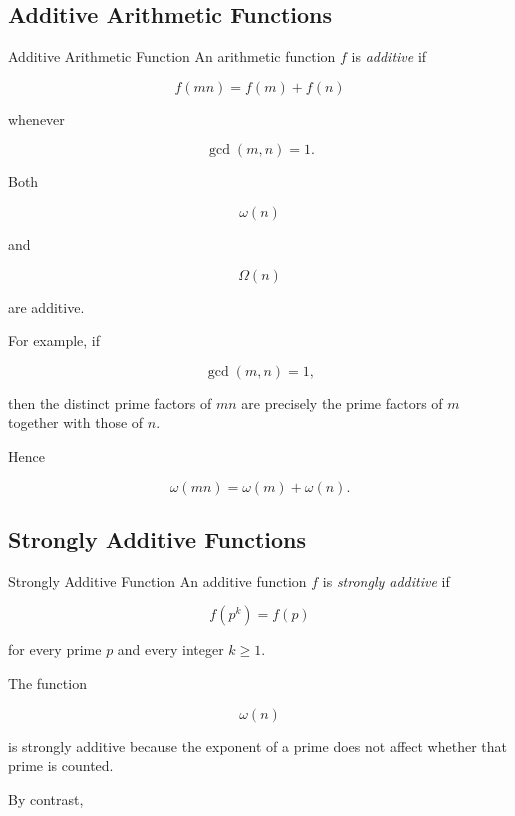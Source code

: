 \subsection{Additive Arithmetic Functions}
\label{subsec:additive-arithmetic-functions-probabilistic}

\begin{definitionbox}{Additive Arithmetic Function}
An arithmetic function \(f\) is \emph{additive} if

\[ f(mn)=f(m)+f(n) \]

whenever

\[ \gcd(m,n)=1. \]
\end{definitionbox}

Both

\[ \omega(n) \]

and

\[ \Omega(n) \]

are additive.

For example, if

\[ \gcd(m,n)=1, \]

then the distinct prime factors of \(mn\) are precisely the prime factors of
\(m\) together with those of \(n\).

Hence

\[ \omega(mn)=\omega(m)+\omega(n). \]

\subsection{Strongly Additive Functions}
\label{subsec:strongly-additive-functions}

\begin{definitionbox}{Strongly Additive Function}
An additive function \(f\) is \emph{strongly additive} if

\[ f(p^k)=f(p) \]

for every prime \(p\) and every integer \(k\geq1\).
\end{definitionbox}

The function

\[ \omega(n) \]

is strongly additive because the exponent of a prime does not affect whether
that prime is counted.

By contrast,

